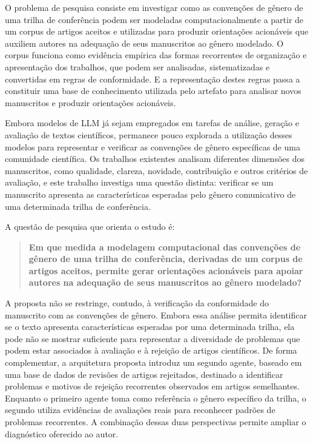 O problema de pesquisa consiste em investigar como as convenções de gênero de uma trilha de conferência podem ser modeladas computacionalmente a partir de um corpus de artigos aceitos e utilizadas para produzir orientações acionáveis que auxiliem autores na adequação de seus manuscritos ao gênero modelado. O corpus funciona como evidência empírica das formas recorrentes de organização e apresentação dos trabalhos, que podem ser analisadas, sistematizadas e convertidas em regras de conformidade. E a representação destes regras passa a constituir uma base de conhecimento utilizada pelo artefato para analisar novos manuscritos e produzir orientações acionáveis.

Embora modelos de LLM já sejam empregados em tarefas de análise, geração e avaliação de textos científicos, permanece pouco explorada a utilização desses modelos para representar e verificar as convenções de gênero específicas de uma comunidade científica. Os trabalhos existentes analisam diferentes dimensões dos manuscritos, como qualidade, clareza, novidade, contribuição e outros critérios de avaliação, e este trabalho investiga uma questão distinta: verificar se um manuscrito apresenta as características esperadas pelo gênero comunicativo de uma determinada trilha de conferência.

A questão de pesquisa que orienta o estudo é:

\begin{quotation}
\noindent \textbf{Em que medida a modelagem computacional das convenções de gênero de uma trilha de conferência, derivadas de um corpus de artigos aceitos, permite gerar orientações acionáveis para apoiar autores na adequação de seus manuscritos ao gênero modelado?}
\end{quotation}

A proposta não se restringe, contudo, à verificação da conformidade do manuscrito com as convenções de gênero. Embora essa análise permita identificar se o texto apresenta características esperadas por uma determinada trilha, ela pode não se mostrar suficiente para representar a diversidade de problemas que podem estar associados à avaliação e à rejeição de artigos científicos. De forma complementar, a arquitetura proposta introduz um segundo agente, baseado em uma base de dados de revisões de artigos rejeitados, destinado a identificar problemas e motivos de rejeição recorrentes observados em artigos semelhantes. Enquanto o primeiro agente toma como referência o gênero específico da trilha, o segundo utiliza evidências de avaliações reais para reconhecer padrões de problemas recorrentes. A combinação dessas duas perspectivas permite ampliar o diagnóstico oferecido ao autor.



